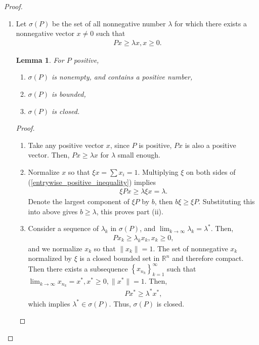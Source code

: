 \documentclass[11pt]{book}
\newtheorem{lemma}[theorem]{Lemma}
\theoremstyle{definition}
\numberwithin{equation}{chapter}
\begin{document}
\begin{proof}
~\begin{enumerate}[label=(\alph*)]
    \item Let $\sigma(P)$ be the set of all nonnegative number $\lambda$ for which there exists a nonnegative vector $x \neq 0$ such that
    \begin{align}\label{entrywise_positive_inequality}
        Px \geq \lambda x, x \geq 0.
    \end{align}
    
    \begin{lemma}
    For $P$ positive, 
    \begin{enumerate}[label=(\roman*)]
        \item $\sigma(P)$ is nonempty, and contains a positive number,
        
        \item $\sigma(P)$ is bounded,
        
        \item $\sigma(P)$ is closed.
    \end{enumerate}
    \end{lemma}
    \begin{proof}
    ~\begin{enumerate}[label=(\roman*)]
        \item Take any positive vector $x$, since $P$ is positive, $Px$ is also a positive vector. Then, $Px \geq \lambda x$ for $\lambda$ small enough.
        
        \item Normalize $x$ so that $\xi x = \sum x_i = 1$. Multiplying $\xi$ on both sides of (\ref{entrywise_positive_inequality}) implies
        \begin{align*}
            \xi Px \geq \lambda \xi x = \lambda.
        \end{align*}
        Denote the largest component of $\xi P$ by $b$, then $b \xi \geq \xi P$. Substituting this into above gives $b \geq \lambda$, this proves part (ii).
        
        \item Consider a sequence of $\lambda_k$ in $\sigma(P)$, and $\lim_{k\to\infty} \lambda_k = \lambda^*$. Then,
        \begin{align*}
            Px_k \geq \lambda_k x_k, x_k \geq 0,
        \end{align*}
        and we normalize $x_k$ so that $\|x_k\| = 1$. The set of nonnegative $x_k$ normalized by $\xi$ is a closed bounded set in $\mathbb{R}^n$ and therefore compact. Then there exists a subsequence $\left\{x_{n_k}\right\}^\infty_{k=1}$ such that $\lim_{k\to\infty} x_{n_k} = x^*, x^* \geq 0, \|x^*\| = 1$. Then,
        \begin{align*}
            P x^* \geq \lambda^* x^*,
        \end{align*}
        which implies $\lambda^* \in \sigma(P)$. Thus, $\sigma(P)$ is closed.
     \end{enumerate}
    \end{proof}
    

\end{enumerate}
\end{proof}
\end{document}
